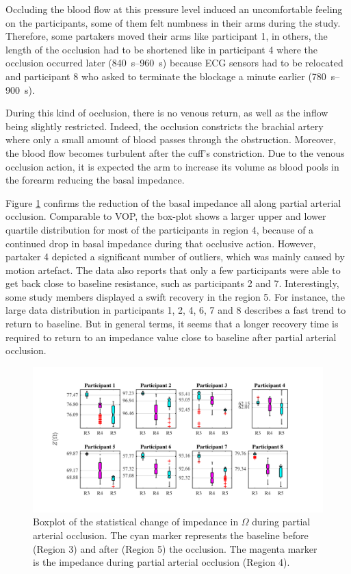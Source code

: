 Occluding the blood flow at this pressure level induced an uncomfortable feeling on the participants, some of them felt numbness in their arms during the study. Therefore, some partakers moved their arms like participant 1, in others, the length of the occlusion had to be shortened like in participant 4 where the occlusion occurred later (\SIrange{840}{960}{\second}) because ECG sensors had to be relocated and participant 8 who asked to terminate the blockage a minute earlier (\SIrange{780}{900}{\second}). 

During this kind of occlusion, there is no venous return, as well as the inflow being slightly restricted. Indeed, the occlusion constricts the brachial artery where only a  small amount of blood passes through the obstruction. Moreover, the blood flow becomes turbulent after the cuff's constriction.  Due to the venous occlusion action, it is expected the arm to increase its volume as blood pools in the forearm reducing the basal impedance. 

Figure \ref{fig:partial arterial statistics impedance} confirms the reduction of the basal impedance all along partial arterial occlusion. Comparable to VOP, the box-plot shows a larger upper and lower quartile distribution for most of the participants in region 4, because of a continued drop in basal impedance during that occlusive action. However, partaker 4 depicted a significant number of outliers, which was mainly caused by motion artefact. The data also reports that only a few participants were able to get back close to baseline resistance, such as participants 2 and 7. Interestingly, some study members displayed a swift recovery in the region 5. For instance, the large data distribution in participants 1, 2, 4, 6, 7 and 8 describes a fast trend to return to baseline. But in general terms, it seems that a longer recovery time is required to return to an impedance value close to baseline after partial arterial occlusion. 

\begin{figure}[htbp]
	\centering
	\includegraphics[width=15cm,keepaspectratio]{figure_vop_4}    
	\caption[Change of impedance during partial arterial occlusion]{Boxplot of the statistical change of impedance in $\Omega$ during partial arterial occlusion. The cyan marker represents the baseline before (Region 3) and after (Region 5) the occlusion. The magenta marker is the impedance during partial arterial occlusion (Region 4).}
	\label{fig:partial arterial statistics impedance}
\end{figure}  

